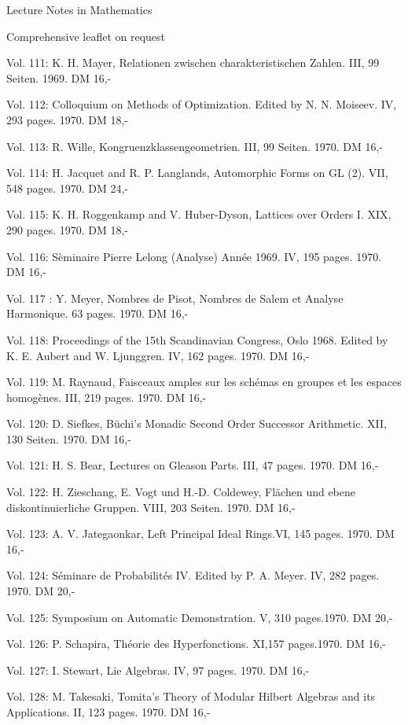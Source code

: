 \clearpage
\begingroup
\small
\sloppy
Lecture Notes in Mathematics


Comprehensive leaflet on request

Vol. 111: K. H. Mayer, Relationen zwischen charakteristischen Zahlen. III, 99 Seiten. 1969. DM 16,-

Vol. 112: Colloquium on Methods of Optimization. Edited by N. N. Moiseev. IV, 293 pages. 1970. DM 18,-

Vol. 113: R. Wille, Kongruenzklassengeometrien. III, 99 Seiten. 1970. DM 16,-

Vol. 114: H. Jacquet and R. P. Langlands, Automorphic Forms on GL (2). VII, 548 pages. 1970. DM 24,-

Vol. 115: K. H. Roggenkamp and V. Huber-Dyson, Lattices over Orders I. XIX, 290 pages. 1970. DM 18,-

Vol. 116: Sèminaire Pierre Lelong (Analyse) Année 1969. IV, 195 pages. 1970. DM 16,-

Vol. 117 : Y. Meyer, Nombres de Pisot, Nombres de Salem et Analyse Harmonique. 63 pages. 1970. DM 16,-

Vol. 118: Proceedings of the 15th Scandinavian Congress, Oslo 1968. Edited by K. E. Aubert and W. Ljunggren. IV, 162 pages. 1970. DM 16,-

Vol. 119: M. Raynaud, Faisceaux amples sur les schémas en groupes et les espaces homogènes. III, 219 pages. 1970. DM 16,-

Vol. 120: D. Siefkes, Büchi's Monadic Second Order Successor Arithmetic. XII, 130 Seiten. 1970. DM 16,-

Vol. 121: H. S. Bear, Lectures on Gleason Parts. III, 47 pages. 1970. DM 16,-

Vol. 122: H. Zieschang, E. Vogt und H.-D. Coldewey, Flächen und ebene diskontinuierliche Gruppen. VIII, 203 Seiten. 1970. DM 16,-

Vol. 123: A. V. Jategaonkar, Left Principal Ideal Rings.VI, 145 pages. 1970. DM 16,-

Vol. 124: Séminare de Probabilités IV. Edited by P. A. Meyer. IV, 282 pages. 1970. DM 20,-

Vol. 125: Symposium on Automatic Demonstration. V, 310 pages.1970. DM 20,-

Vol. 126: P. Schapira, Théorie des Hyperfonctions. XI,157 pages.1970. DM 16,-

Vol. 127: I. Stewart, Lie Algebras. IV, 97 pages. 1970. DM 16,-

Vol. 128: M. Takesaki, Tomita's Theory of Modular Hilbert Algebras and its Applications. II, 123 pages. 1970. DM 16,-

